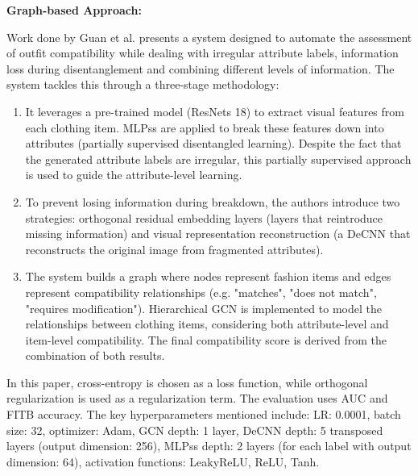 \vspace{0.5cm}

\textbf{Graph-based Approach:}

\vspace{0.5cm}

Work done by Guan et al. presents a system designed to automate the assessment of outfit compatibility while dealing with irregular attribute labels, information loss during disentanglement and combining different levels of information. The system tackles this through a three-stage methodology: \cite[cf.]{guan_partially_2022}

\begin{enumerate}
  \item It leverages a pre-trained model (\acsp{ResNet} 18) to extract visual features from each clothing item. \acsp{MLPs} are applied to break these features down into attributes (partially supervised disentangled learning). Despite the fact that the generated attribute labels are irregular, this partially supervised approach is used to guide the attribute-level learning.
  \item To prevent losing information during breakdown, the authors introduce two strategies: orthogonal residual embedding layers (layers that reintroduce missing information) and visual representation reconstruction (a \acs{DeCNN} that reconstructs the original image from fragmented attributes).
  \item The system builds a graph where nodes represent fashion items and edges represent compatibility relationships (e.g. "matches", "does not match", "requires modification"). Hierarchical \acs{GCN} is implemented to model the relationships between clothing items, considering both attribute-level and item-level compatibility. The final compatibility score is derived from the combination of both results.
\end{enumerate}

In this paper, cross-entropy is chosen as a loss function, while orthogonal regularization is used as a regularization term. The evaluation uses \acs{AUC} and \acs{FITB} accuracy. The key hyperparameters mentioned include: \acs{LR}: 0.0001, batch size: 32, optimizer: Adam, \acs{GCN} depth: 1 layer, \acs{DeCNN} depth: 5 transposed layers (output dimension: 256), \acsp{MLPs} depth: 2 layers (for each label with output dimension: 64), activation functions: LeakyReLU, \acs{ReLU}, Tanh. \cite[cf.]{guan_partially_2022}

\vspace{0.5cm}

